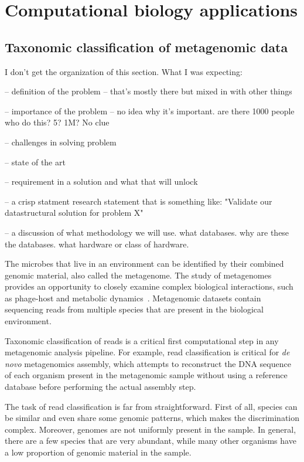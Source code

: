 
\section{Computational biology applications}


\subsection{Taxonomic classification of metagenomic data}

{\color{red} I don't get the organization of this section.  What I was expecting:

-- definition of the problem -- that's mostly there but mixed in with other things

-- importance of the problem -- no idea why it's important.  are there 1000 people who do this?  5?  1M?  No clue 

-- challenges in solving problem

-- state of the art

-- requirement in a solution and what that will unlock

-- a crisp statment research statement that is something like: "Validate our datastructural solution for problem X"

-- a discussion of what methodology we will use.  what databases.  why are these the databases.  what hardware or class of hardware.
}

The microbes that live in an environment can be identified by their combined genomic material, also called the metagenome.
The study of metagenomes provides an opportunity to closely examine complex biological interactions, such as phage-host and metabolic dynamics~\cite{national2007new}.
Metagenomic datasets contain sequencing reads from multiple species that are present in the biological environment. 

Taxonomic classification of reads is a critical first computational step in any metagenomic analysis pipeline.
For example, read classification is critical for \emph{de novo} metagenomics assembly, which attempts to reconstruct the DNA sequence of each organism present in the metagenomic sample without using a reference database before performing the actual assembly step.

The task of read classification is far from straightforward.
First of all, species can be similar and even share some genomic patterns, which makes the discrimination complex. 
Moreover, genomes are not uniformly present in the sample.
In general, there are a few species that are very abundant, while many other organisms have a low proportion of genomic material in the sample.

